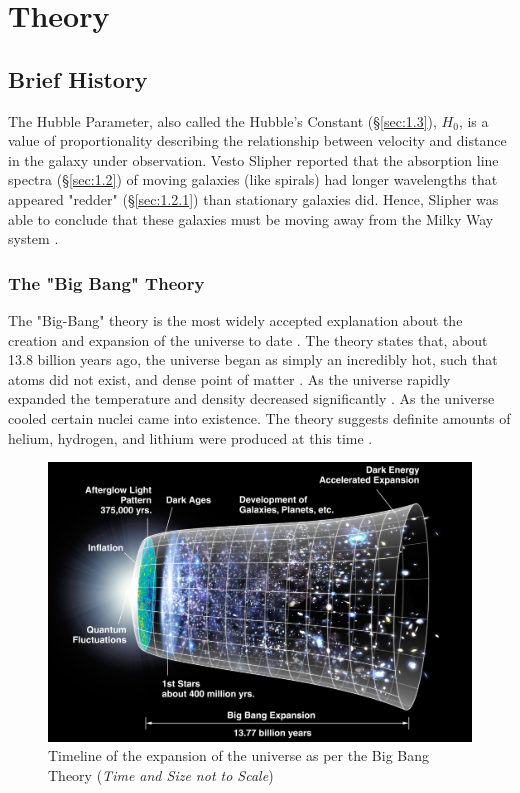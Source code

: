 \documentclass[12pt]{article}
\begin{document}


\section{Theory}

\subsection{Brief History} \label{sec:1.1}

The Hubble Parameter, also called the Hubble's Constant (§\ref{sec:1.3}), $H_0$, is a value of \break
proportionality describing the relationship
between velocity and distance in the galaxy under observation. Vesto Slipher reported that the absorption line spectra (§\ref{sec:1.2}) of moving galaxies
(like spirals) had longer wavelengths that appeared "redder" (§\ref{sec:1.2.1}) than stationary galaxies did. Hence, Slipher was able to conclude 
that these galaxies must be moving away from the Milky Way system
\cite{UCDhubble,brithubble}.

\subsubsection{The "Big Bang" Theory} \label{sec:1.1.1}

The "Big-Bang" theory is the most widely accepted explanation about the creation and \allowbreak expansion of the universe to date
\cite{britbigbang,spacebigbang}.
The theory states that, about 13.8 billion years ago, the universe began as simply an incredibly hot, such that atoms did not exist, 
and dense point of matter
\cite{britbigbang,spacebigbang,hubblebigbang}.
As the universe rapidly expanded the temperature and density decreased significantly
\cite{britbigbang,hubblebigbang}.
As the universe cooled certain nuclei came into existence. The theory suggests definite amounts of helium, hydrogen, and lithium were produced at this time
\cite{britbigbang}.

\begin{figure}[H]
    \centering
    \includegraphics[width=15cm]{bigbang.jpg}
    \caption{\centering \footnotesize{Timeline of the expansion of the universe as per the Big Bang Theory (\textit{Time and Size not to Scale})} \protect\cite{bigbangpic}}
    \label{fig:bigbang}
\end{figure}
\end{document}
